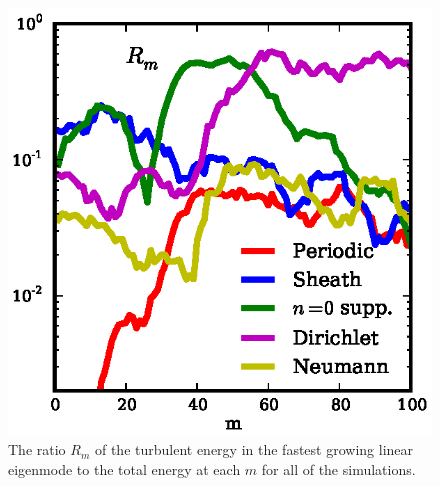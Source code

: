 \documentclass[showpacs,preprintnumbers,amsmath,amssymb,superscriptaddress,aip]{revtex4-1}
\begin{document}
\begin{figure}[!htbp]
\includegraphics[]{ratios}
\hfil
\caption{The ratio $R_m$ of the turbulent energy in the fastest growing linear eigenmode to the total energy at each $m$ for all of the simulations.}
\label{ratios}
\end{figure}
\end{document}

